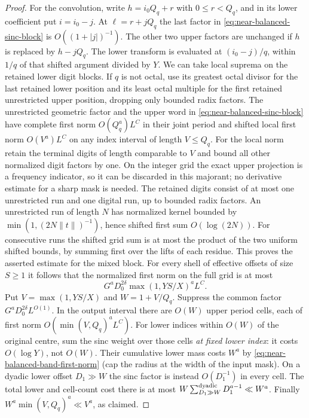 \documentclass[11pt,a4paper]{article}
\theoremstyle{paperplain}
\numberwithin{equation}{section}
\begin{document}
\begin{proof}
For the convolution, write $h=i_0 Q_q+r$ with $0\le r<Q_q$,
and in its lower coefficient put $i=i_0-j$. At
$\ell=r+jQ_q$ the last factor in
\eqref{eq:near-balanced-sinc-block} is $O((1+|j|)^{-1})$.
The other two upper factors are unchanged if $h$ is replaced
by $h-jQ_q$. The lower transform is evaluated at $(i_0-j)/q$,
within $1/q$ of that shifted argument divided by $Y$.
We can take local suprema on the retained lower digit blocks.
If $q$ is not octal, use its greatest octal divisor for the
last retained lower position and its least octal multiple
for the first retained unrestricted upper position, dropping
only bounded radix factors. The unrestricted geometric
factor and the upper word in
\eqref{eq:near-balanced-sinc-block} have complete first norm
$O(Q_q^a)L^C$ in their joint period and shifted local first
norm $O(V^a)L^C$ on any index interval of length $V\le Q_q$.
For the local norm retain the terminal digits of length comparable
to $V$ and bound all other normalized digit factors by one. On the
integer grid the exact upper projection is a frequency indicator, so
it can be discarded in this majorant; no derivative estimate for a
sharp mask is needed. The retained digits consist of at most one
unrestricted run and one digital run, up to bounded radix factors.
An unrestricted run of length $N$ has normalized kernel bounded by
$\min(1,(2N\|t\|)^{-1})$, hence shifted first sum $O(\log(2N))$.
For consecutive runs the shifted grid sum is at most the product of
the two uniform shifted bounds, by summing first over the lifts of
each residue. This proves the asserted estimate for the mixed block. For every shell of
effective offsets of size $S\ge1$ it follows that the
normalized first norm on the full grid is at most
\begin{equation}\label{eq:near-balanced-lift-first-norm}
                  G^a D_0^{2\delta}\max(1,YS/X)^a L^C .
\end{equation}
Put $V=\max(1,YS/X)$ and $W=1+V/Q_q$. Suppress the common
factor $G^aD_0^{2\delta}L^{O(1)}$. In the output interval there
are $O(W)$ upper period cells, each of first norm
$O(\min(V,Q_q)^a L^C)$. For lower indices within $O(W)$ of the
original centre, sum the sinc weight over those cells \emph{at fixed
lower index}: it costs $O(\log Y)$, not $O(W)$. Their cumulative
lower mass costs $W^a$ by \eqref{eq:near-balanced-band-first-norm}
(cap the radius at the width of the input mask). On a dyadic lower
offset $D_1\gg W$ the sinc factor is instead $O(D_1^{-1})$ in
every cell. The total lower and cell-count cost there is at most
$W\sum_{D_1\gg W}^{\rm dyadic}D_1^{a-1}\ll W^a$. Finally
$W^a\min(V,Q_q)^a\ll V^a$, as claimed.


\end{proof}
\end{document}
